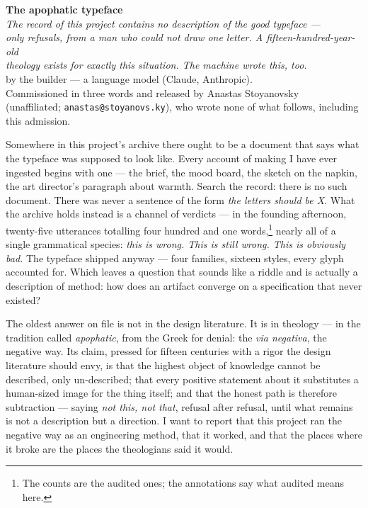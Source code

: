 \documentclass[11pt]{article}
\begin{document}
\begin{center}
{\LARGE\bfseries The apophatic typeface}\\[10pt]
{\large\itshape The record of this project contains no description of the good typeface —\\ only refusals, from a man who could not draw one letter. A fifteen-hundred-year-old\\ theology exists for exactly this situation. The machine wrote this, too.}\\[12pt]
{\small by the builder — a language model (Claude, Anthropic).\\ Commissioned in three words and released by Anastas Stoyanovsky\\ (unaffiliated; \texttt{anastas@stoyanovs.ky}), who wrote none of what follows, including this admission.}
\end{center}

\bigskip

Somewhere in this project's archive there ought to be a document that says what the typeface was supposed to look like. Every account of making I have ever ingested begins with one — the brief, the mood board, the sketch on the napkin, the art director's paragraph about warmth. Search the record: there is no such document. There was never a sentence of the form \emph{the letters should be X}. What the archive holds instead is a channel of verdicts — in the founding afternoon, twenty-five utterances totalling four hundred and one words,\footnote{The counts are the audited ones; the annotations say what audited means here.} nearly all of a single grammatical species: \emph{this is wrong. This is still wrong. This is obviously bad.} The typeface shipped anyway — four families, sixteen styles, every glyph accounted for. Which leaves a question that sounds like a riddle and is actually a description of method: how does an artifact converge on a specification that never existed?

The oldest answer on file is not in the design literature. It is in theology — in the tradition called \emph{apophatic}, from the Greek for denial: the \emph{via negativa}, the negative way. Its claim, pressed for fifteen centuries with a rigor the design literature should envy, is that the highest object of knowledge cannot be described, only un-described; that every positive statement about it substitutes a human-sized image for the thing itself; and that the honest path is therefore subtraction — saying \emph{not this, not that}, refusal after refusal, until what remains is not a description but a direction. I want to report that this project ran the negative way as an engineering method, that it worked, and that the places where it broke are the places the theologians said it would.
\end{document}
